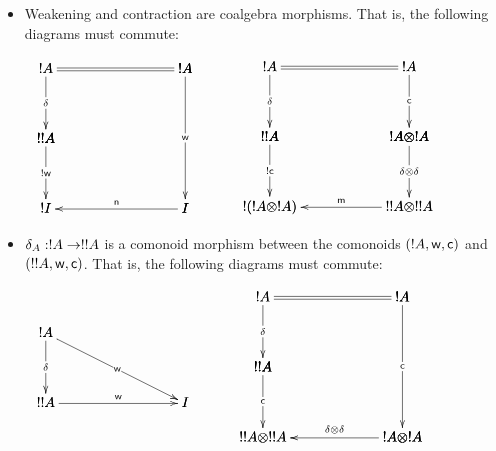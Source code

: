 \begin{definition}
\begin{itemize}
\begin{itemize}
    \item Weakening and contraction are coalgebra morphisms.  That is,
      the following diagrams must commute:
      \begin{center}
        \begin{math}
          \begin{array}{lll}
            \bfig
            \square|amma|/=`->``/<1000,500>[
              !A`
              !A`
              !!A`;`
              \delta``]

            \square(0,-500)|amma|/`->``<-/<1000,500>[
              !!A``
              !I`
              I;`
              !\weak``
              \nm]

            \morphism(1000,500)|m|<0,-1000>[
              !A`
              I;
              \weak]
            \efig
            & \quad &
            \bfig
            \square|amma|/=`->`->`/<1000,500>[
              ! A`
              ! A`
              ! ! A`
              !A \otimes !A;`
              \delta`
              \con`]

            \square(0,-500)|amma|/`->`->`<-/<1000,500>[
              ! ! A`
              !A \otimes ! A`
              !(!A \otimes !A)`
              !!A \otimes !!A;`
              ! \con`
              \delta \otimes \delta`
              \mm]
            \efig
          \end{array}
        \end{math}
      \end{center}
      
    \item $\delta_A : !A \rightarrow !!A$ is a comonoid morphism between the
      comonoids $(!A,\mathsf{w},\mathsf{c})$ and $(!!A,\mathsf{w},\mathsf{c})$.  That is,
      the following diagrams must commute:
      \begin{center}
        \begin{math}
          \begin{array}{lll}            
            \bfig
            \btriangle|mma|/->`->`->/<1000,500>[
              !A`
              !!A`
              I;
              \delta`
              \weak`
              \weak]            
            \efig
            & \quad &
            \bfig
            \square|amma|/=`->``/<1000,500>[
              !A`
              !A`
              !!A`;`
              \delta``]
            
            \square(0,-500)|amma|/`->``<-/<1000,500>[
              !!A``
              !!A \otimes !!A`
              !A \otimes !A;`
              \con``
              \delta \otimes \delta]
            
            \morphism(1000,500)|m|<0,-1000>[
              !A`
              !A \otimes !A;
              \con]
            \efig
          \end{array}
        \end{math}
      \end{center}                
    \end{itemize}
  \end{itemize}    
\end{definition}

